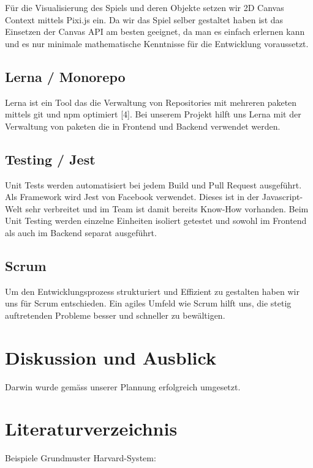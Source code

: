 \documentclass[11pt,a4paper,titlepage]{article}
\begin{document}
Für die Visualisierung des Spiels und deren Objekte setzen wir 2D Canvas Context mittels Pixi.js ein. Da wir das Spiel selber gestaltet haben ist das Einsetzen der Canvas API am besten geeignet, da man es einfach erlernen kann und es nur minimale mathematische Kenntnisse für die Entwicklung voraussetzt.

\subsection{Lerna / Monorepo}
Lerna ist ein Tool das die Verwaltung von Repositories mit mehreren paketen mittels git und npm optimiert [4]. Bei unserem Projekt hilft uns Lerna mit der Verwaltung von paketen die in Frontend und Backend verwendet werden.

\subsection{Testing / Jest}
Unit Tests werden automatisiert bei jedem Build und Pull Request ausgeführt.
Als Framework wird Jest von Facebook verwendet. Dieses ist in der Javascript-Welt sehr verbreitet und im Team ist damit bereits Know-How vorhanden.
Beim Unit Testing werden einzelne Einheiten isoliert getestet und sowohl im Frontend als auch im Backend separat ausgeführt.

\subsection{Scrum}
Um den Entwicklungsprozess strukturiert und Effizient zu gestalten haben wir uns für Scrum entschieden. Ein agiles Umfeld wie Scrum hilft uns, die stetig auftretenden Probleme besser und schneller zu bewältigen.

\section{Diskussion und Ausblick}
Darwin wurde gemäss unserer Plannung erfolgreich umgesetzt.


%

\section{Literaturverzeichnis}
Beispiele Grundmuster Harvard-System:
\end{document}
